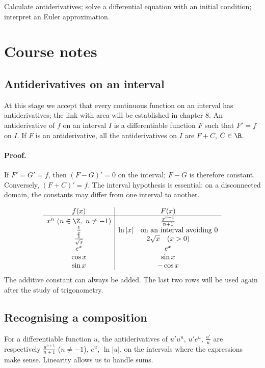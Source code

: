 \label{ch:7}


\begin{keypoint}[Objectives]Calculate antiderivatives; solve a differential equation with an initial condition; interpret an Euler approximation.\end{keypoint}

\section{Course notes}
\subsection{Antiderivatives on an interval}
At this stage we accept that every continuous function on an interval has antiderivatives; the link with area will be established in chapter 8.
An antiderivative of $f$ on an interval $I$ is a differentiable function $F$ such that $F'=f$ on $I$. If $F$ is an antiderivative, all the antiderivatives on $I$ are $F+C$, $C\in\R$.
\paragraph{Proof.} If $F'=G'=f$, then $(F-G)'=0$ on the interval; $F-G$ is therefore constant. Conversely, $(F+C)'=f$. The interval hypothesis is essential: on a disconnected domain, the constants may differ from one interval to another.
\begin{keypoint}
\[\begin{array}{c|c}
f(x)&F(x)\\\hline
x^n\ (n\in\Z,\ n\ne-1)&\frac{x^{n+1}}{n+1}\\
\frac{1}{x}&\ln|x|\quad\text{on an interval avoiding }0\\
\frac{1}{\sqrt{x}}&2\sqrt{x}\quad(x>0)\\
e^x&e^x\\
\cos x&\sin x\\
\sin x&-\cos x
\end{array}\]
The additive constant can always be added. The last two rows will be used again after the study of trigonometry.
\end{keypoint}
\subsection{Recognising a composition}
For a differentiable function $u$, the antiderivatives of $u'u^n$, $u'e^u$, $\frac{u'}{u}$ are respectively $\frac{u^{n+1}}{n+1}$ ($n\ne-1$), $e^u$, $\ln|u|$, on the intervals where the expressions make sense. Linearity allows us to handle sums.
